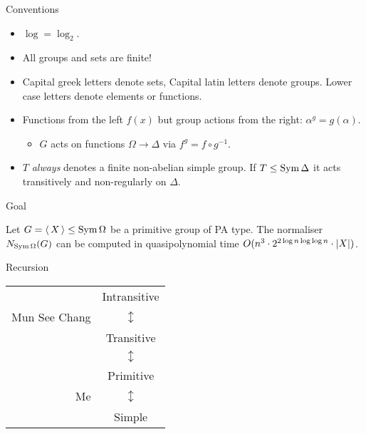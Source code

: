 \begin{frame}{Conventions}
\begin{itemize}
\setlength\itemsep{\fill}
\item
$\log = \log_2$.
\item
All groups and sets are finite!
\item
Capital greek letters denote sets,
Capital latin letters denote groups.
Lower case letters denote elements or functions.
\item
Functions from the left $f(x)$
but group actions from the right: $\alpha ^ g = g(\alpha)$.
    \begin{itemize}
        \item
        $G$ acts on functions $\Omega \to \Delta$ via
        $f ^ g = f \circ g ^ {-1}$.
    \end{itemize}
\item
$T$ \emph{always} denotes a finite non-abelian simple group.
If $T \leq \operatorname{Sym} \Delta$ it acts transitively and non-regularly on $\Delta$.
\end{itemize}
\end{frame}

\begin{frame}{Goal}
    \begin{thm}
        Let $G =  \left\langle \, X \, \right\rangle  \leq \operatorname{Sym} \Omega$ be a primitive group
        of PA type.
        The normaliser
        $N_{\operatorname{Sym} \Omega}(G)$
        can be computed in quasipolynomial time
        $O(n ^ 3 \cdot 2 ^ {2 \log n \log \log n} \cdot  \left| X \right| )$.
    \end{thm}
\end{frame}

\begin{frame}{Recursion}
    \begin{center}
        \hspace{-5em}
        \begin{tabular}{r c}
            & Intransitive
            \\
            Mun See Chang & $\updownarrow$
            \\
            & Transitive
            \\
            & $\updownarrow$
            \\
            & Primitive
            \\
            Me & $\updownarrow$
            \\
            & Simple
        \end{tabular}
    \end{center}
\end{frame}
